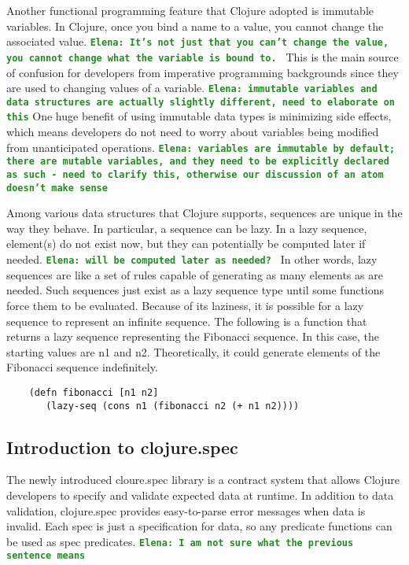 \documentclass[12pt]{article}
\newcommand{\comment}[1]{{\bf \tt  {#1}}}
\newcommand{\emcomment}[1]{\textcolor{ForestGreen}{\comment{Elena: {#1}}}}
\newcommand{\tscomment}[1]{\textcolor{Teal}{\comment{Tony: {#1}}}}
\begin{document}
	Another functional programming feature that Clojure adopted is immutable variables. In Clojure, once you bind a 
	name to a value, you cannot change the associated value. \emcomment{It's not just that you can't change the value, you cannot change
	what the variable is bound to. }
	This is the main source of confusion for developers from imperative programming backgrounds since they are used to 
	changing values of a variable.
	\emcomment{immutable variables and data structures are actually slightly different, need to elaborate on this} 
	One huge benefit of using immutable data types is minimizing side effects, which means 
	developers do not need to worry about variables being modified from unanticipated operations.
	\emcomment{variables are immutable by default; there are mutable variables, and they need to be explicitly declared as such - need to clarify this, 
	otherwise our discussion of an atom doesn't make sense}

	Among various data structures that Clojure supports, sequences are unique in 
	the way they behave. In particular, a sequence can be lazy. In a lazy sequence, element(s) do not exist now, but they 
	can potentially be computed later if needed. 
	\emcomment{will be computed later as needed? }
	In other words, lazy sequences are like a set of rules capable of generating as many elements as are needed.
	Such sequences just exist as a lazy sequence type until some functions force them to be evaluated. Because of its laziness, it is possible 
	for a lazy sequence to represent an infinite sequence. The following is a function that returns a lazy sequence representing the 
	Fibonacci sequence. In this case, the starting values are n1 and n2. Theoretically, it could generate elements of the Fibonacci 
	sequence indefinitely. 
	\begin{verbatim}
	(defn fibonacci [n1 n2]
	   (lazy-seq (cons n1 (fibonacci n2 (+ n1 n2))))
	\end{verbatim}
	
	\subsection{Introduction to clojure.spec}
	The newly introduced cloure.spec library is a contract system that allows Clojure developers to specify and validate expected data 
	at runtime. In addition to data validation, clojure.spec provides easy-to-parse error messages when data is invalid. Each spec is just a 				 
	specification for data, so any predicate functions can be used as spec predicates. 
	\emcomment{I am not sure what the previous sentence means}
\end{document}
